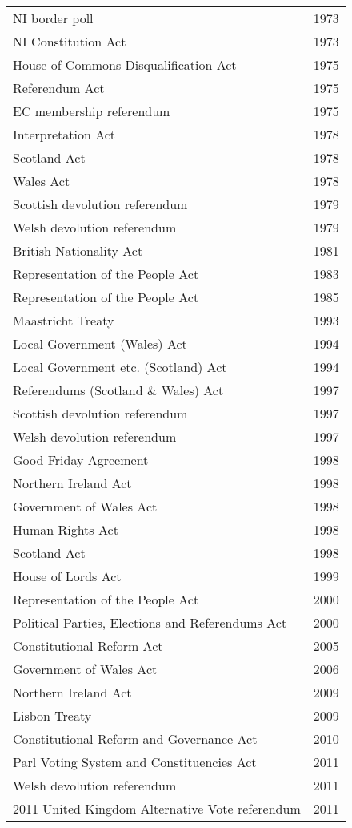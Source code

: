 \documentclass[14pt,titlepage]{extarticle}
\begin{document}
{\begin{longtable}{l l}
NI border poll & 1973\\
NI Constitution Act & 1973\\
House of Commons Disqualification Act & 1975\\
Referendum Act & 1975\\
EC membership referendum & 1975\\
Interpretation Act & 1978\\
Scotland Act  & 1978\\
Wales Act  & 1978\\
Scottish devolution referendum & 1979\\
Welsh devolution referendum & 1979\\
British Nationality Act  & 1981\\
Representation of the People Act  & 1983\\
Representation of the People Act  & 1985\\
Maastricht Treaty & 1993\\
Local Government (Wales) Act & 1994\\
Local Government etc. (Scotland) Act & 1994\\
Referendums (Scotland \& Wales) Act & 1997\\
Scottish devolution referendum & 1997\\
Welsh devolution referendum & 1997\\
Good Friday Agreement & 1998\\
Northern Ireland Act & 1998\\
Government of Wales Act & 1998\\
Human Rights Act & 1998\\
Scotland Act & 1998\\
House of Lords Act & 1999\\
Representation of the People Act  & 2000\\
Political Parties, Elections and Referendums Act & 2000\\
Constitutional Reform Act & 2005\\
Government of Wales Act  & 2006\\
Northern Ireland Act  & 2009\\
Lisbon Treaty & 2009\\
Constitutional Reform and Governance Act & 2010\\
Parl Voting System and Constituencies Act & 2011\\
Welsh devolution referendum & 2011\\
2011 United Kingdom Alternative Vote referendum & 2011\\

\end{longtable}}
\end{document}
